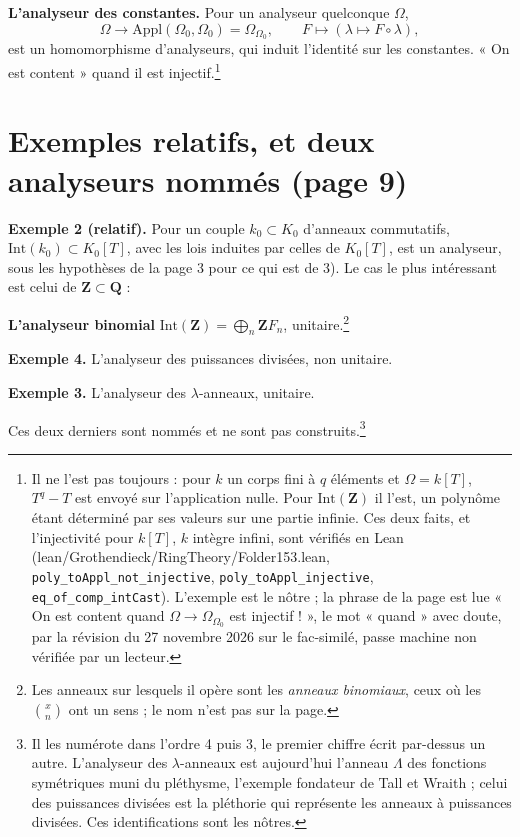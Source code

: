 \documentclass[11pt,a4paper]{article}
\begin{document}
\textbf{L'analyseur des constantes.} Pour un analyseur quelconque $\Omega$,
\[
\Omega \longrightarrow \mathrm{Appl}(\Omega_{0}, \Omega_{0}) = \Omega_{\Omega_{0}},
\qquad F \longmapsto (\lambda \mapsto F \circ \lambda),
\]
est un homomorphisme d'analyseurs, qui induit l'identité sur les constantes. « On
est content » quand il est injectif.\footnote{Il ne l'est pas toujours : pour
$k$ un corps fini à $q$ éléments et $\Omega = k[T]$, $T^{q} - T$ est envoyé sur
l'application nulle. Pour $\mathrm{Int}(\mathbf{Z})$ il l'est, un polynôme étant
déterminé par ses valeurs sur une partie infinie. Ces deux faits, et
l'injectivité pour $k[T]$, $k$ intègre infini, sont vérifiés en Lean
(lean/Grothendieck/RingTheory/Folder153.lean, \texttt{poly\_toAppl\_not\_injective},
\texttt{poly\_toAppl\_injective}, \texttt{eq\_of\_comp\_intCast}). L'exemple est le nôtre ; la
phrase de la page est lue « On est content quand $\Omega \to
\Omega_{\Omega_{0}}$ est injectif ! », le mot « quand » avec doute, par la
révision du 27 novembre 2026 sur le fac-similé, passe machine non vérifiée par
un lecteur.}

\section*{Exemples relatifs, et deux analyseurs nommés (page 9)}

\textbf{Exemple 2 (relatif).} Pour un couple $k_{0} \subset K_{0}$ d'anneaux
commutatifs, $\mathrm{Int}(k_{0}) \subset K_{0}[T]$, avec les lois induites par
celles de $K_{0}[T]$, est un analyseur, sous les hypothèses de la page 3 pour ce
qui est de 3). Le cas le plus intéressant est celui de $\mathbf{Z} \subset
\mathbf{Q}$ :

\textbf{L'analyseur binomial} $\mathrm{Int}(\mathbf{Z}) = \bigoplus_{n}
\mathbf{Z} F_{n}$, unitaire.\footnote{Les anneaux sur lesquels il opère sont les
\emph{anneaux binomiaux}, ceux où les $\binom{x}{n}$ ont un sens ; le nom n'est
pas sur la page.}

\textbf{Exemple 4.} L'analyseur des puissances divisées, non unitaire.

\textbf{Exemple 3.} L'analyseur des $\lambda$-anneaux, unitaire.

Ces deux derniers sont nommés et ne sont pas
construits.\footnote{Il les numérote dans l'ordre 4 puis 3, le premier chiffre
écrit par-dessus un autre. L'analyseur des $\lambda$-anneaux est aujourd'hui
l'anneau $\Lambda$ des fonctions symétriques muni du pléthysme, l'exemple
fondateur de Tall et Wraith ; celui des puissances divisées est la pléthorie
qui représente les anneaux à puissances divisées. Ces identifications sont les
nôtres.}
\end{document}

